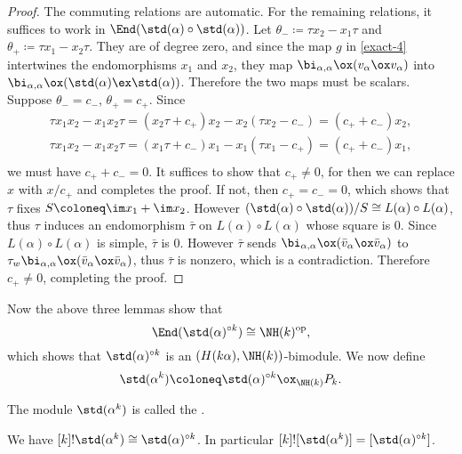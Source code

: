 \begin{proof}
    The commuting relations are automatic. For the remaining relations,
    it suffices to work in $\End(\std(\alpha)\circ\std(\alpha))$.
    Let $\theta_- \coloneq  \tau x_2-x_1\tau$ and $\theta_+ \coloneq  \tau x_1-x_2\tau$.
    They are of degree zero, and since the map $g$ 
    in \ref{exact-4} intertwines the endomorphisms
    $x_1$ and $x_2$, they map $\bi_{\alpha,\alpha}\ox(v_\alpha\ox v_\alpha)$
    into $\bi_{\alpha,\alpha}\ox(\std(\alpha)\ex\std(\alpha))$.
    Therefore the two maps must be scalars. Suppose $\theta_- = c_-$,
    $\theta_+ = c_+$. Since 
    \[
    \begin{aligned}
        \tau x_1 x_2-x_1 x_2\tau = (x_2\tau+c_+)x_2-x_2(\tau x_2-c_-)
         = (c_++c_-)x_2,\\
        \tau x_1 x_2-x_1 x_2\tau = (x_1\tau+c_-)x_1-x_1(\tau x_1-c_+)
         = (c_++c_-)x_1,\\
    \end{aligned}
    \]
    we must have $c_++c_- = 0$. It suffices to show that 
    $c_+\ne 0$, for then we can replace $x$ with $x/c_+$ and completes 
    the proof. If not, then $c_+ = c_- = 0$, which shows that $\tau$
    fixes $S \coloneq  \im x_1+\im x_2$. However $(\std(\alpha)\circ\std(\alpha))
    /S\cong L(\alpha)\circ L(\alpha)$, thus $\tau$ induces an
    endomorphism $\bar\tau$ on $L(\alpha)\circ L(\alpha)$ whose square is $0$.
    Since $L(\alpha)\circ L(\alpha)$ is simple, $\bar\tau$ is $0$.
    However $\bar\tau$ sends $\bi_{\alpha,\alpha}\ox(\bar{v}_\alpha
    \ox\bar{v}_\alpha)$ to $\tau_w\bi_{\alpha,\alpha}\ox(\bar{v}_\alpha
    \ox\bar{v}_\alpha)$, thus $\bar\tau$ is nonzero, which is a contradiction.
    Therefore $c_+\ne 0$, completing the proof.
\end{proof}

Now the above three lemmas show that $$\End(\std(\alpha)^{\circ k})
\cong\NH(k)^{\mathrm{op}},$$ which shows that $\std(\alpha)^{\circ k}$
is an $(H(k\alpha),\NH(k))$-bimodule. We now define $$\std(\alpha^k)
 \coloneq  \std(\alpha)^{\circ k}\ox_{\NH(k)}P_k.$$

\begin{definition}
    The module $\std(\alpha^k)$ is called the .
\end{definition}

\begin{proposition}\label{divided-power}
    We have $[k]!\std(\alpha^k)\cong\std(\alpha)^{\circ k}$.
    In particular $[k]![\std(\alpha^k)] = [\std(\alpha)^{\circ k}]$.
\end{proposition}

